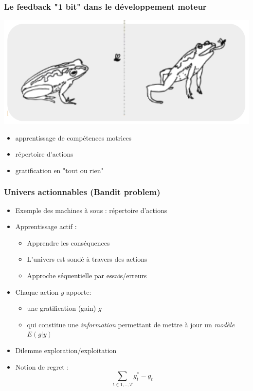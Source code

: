 \documentclass{beamer}
\begin{document}
\begin{frame}
	\frametitle{Le feedback "1 bit" dans le développement moteur}
	\centerline{\includegraphics[width=.7\linewidth]{figs/cap-frog.png}}
	\begin{itemize}
		\item apprentissage de compétences motrices
		\item répertoire d'actions
		\item gratification en "tout ou rien"
	\end{itemize}
\end{frame}


\begin{frame}\frametitle{Univers actionnables (Bandit problem)}
	\begin{itemize}
		\item Exemple des machines à sous : répertoire d'actions
		\item Apprentissage actif : 
		\begin{itemize}
			\item Apprendre les conséquences
			\item L'univers est sondé à travers des actions
			\item Approche séquentielle par essais/erreurs
		\end{itemize}
		\item Chaque action $y$ apporte:
		\begin{itemize}
			\item une gratification (gain) $g$
			\item qui constitue une \textit{information} permettant de mettre à jour un \textit{modèle} $E(g|y)$
		\end{itemize}
		\item Dilemme exploration/exploitation
		\item Notion de regret :
		$$ \sum_{t \in 1,..,T} g^*_t - g_t$$ 
	\end{itemize}
\end{frame}
\end{document}

